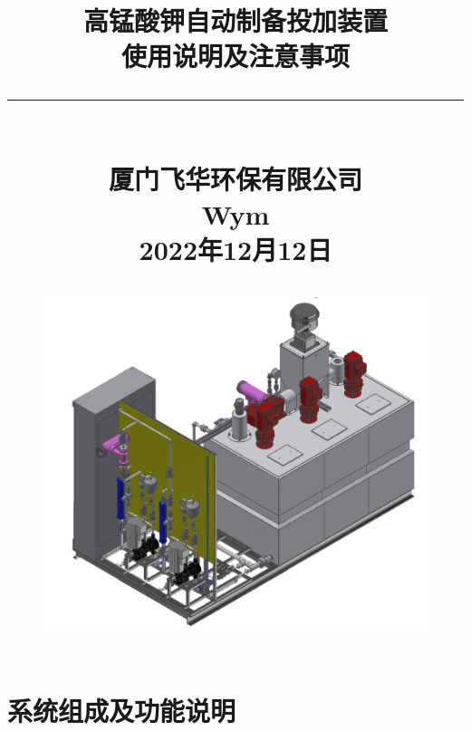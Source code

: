 \documentclass[UTF8,a4paper,12pt,titlepage]{ctexart}
\begin{document}
\title{
    高锰酸钾自动制备投加装置\\[2.5mm]
    使用说明及注意事项\\
   {\noindent}\rule{16cm}{1pt}\\[3mm]
    厦门飞华环保有限公司\\
    Wym\\
    2022年12月12日
   \begin{figure}[h]
      \centering
      \includegraphics[height=10cm]{g0.PNG}
   \end{figure}
}

\maketitle %

\tableofcontents %

\newpage %

\section{系统组成及功能说明}
\end{document}
